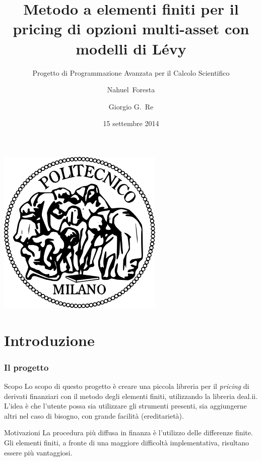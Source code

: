 \documentclass{beamer}
\title[PIDE pricing con elementi finiti] %
{Metodo a elementi finiti per il pricing di opzioni multi-asset con modelli di L\'evy}
\subtitle{Progetto di Programmazione Avanzata per il Calcolo Scientifico}
\author[Foresta, Re] %
{Nahuel~Foresta \and Giorgio G.~Re}
\institute[Politecnico di Milano]{Dipartimento di Matematica\\ \bf{Politecnico di Milano}} %
\date{15 settembre 2014}
\begin{document}

\begin{frame}
\centering
 \includegraphics[scale=0.2]{poli_logo}
 \maketitle
\end{frame}



\section{Introduzione}
\begin{frame}
\frametitle{Il progetto}
\begin{block}{Scopo}
Lo scopo di questo progetto \`e creare una piccola libreria per il \emph{pricing} di derivati finanziari con il metodo degli elementi finiti, utilizzando la libreria \textsf{deal.ii}.
L'idea è che l'utente possa sia utilizzare gli strumenti presenti, sia aggiungerne altri nel caso di bisogno, con grande facilità (ereditariet\`a).
\end{block}
\pause
\vspace{0.5cm}
\begin{block}{Motivazioni}
La procedura pi\`u diffusa in finanza \`e l'utilizzo delle differenze finite. Gli elementi finiti, a fronte di una maggiore difficoltà implementativa, risultano essere pi\`u vantaggiosi.
\end{block}
\end{frame}
\end{document}
